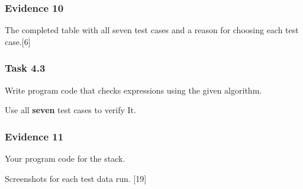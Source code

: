 \subsubsection*{Evidence 10}

The completed table with all seven test cases and a reason for choosing
each test case.\hfill{}{[}6{]}

\subsubsection*{Task 4.3}

Write program code that checks expressions using the given algorithm. 

Use all \textbf{seven} test cases to verify It.

\subsubsection*{Evidence 11}

Your program code for the stack.

Screenshots for each test data run. \hfill{}{[}19{]}
